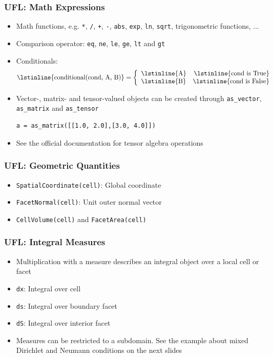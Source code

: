 \documentclass[aspectratio=169,11pt]{beamer}
\theoremstyle{definition}
\begin{document}
\begin{frame}[fragile]
  \frametitle{UFL: Math Expressions}
  \begin{itemize}
  \item Math functions, e.g. \lstinline{*}, \lstinline{/}, \lstinline{+},
    \lstinline{-}, \lstinline{abs}, \lstinline{exp}, \lstinline{ln},
    \lstinline{sqrt}, trigonometric functions, ...
  \item Comparison operator: \lstinline{eq}, \lstinline{ne}, \lstinline{le},
    \lstinline{ge}, \lstinline{lt} and \lstinline{gt}
  \item Conditionals:
    \begin{displaymath}
      \text{\lstinline{conditional(cond, A, B)}} = \left\{
        \begin{array}{lr}
          \text{\lstinline{A}} & \text{\lstinline{cond is True}} \\
          \text{\lstinline{B}} & \text{\lstinline{cond is False}}
        \end{array}
      \right.
    \end{displaymath}
  \item Vector-, matrix- and tensor-valued objects can be created through
    \lstinline{as_vector}, \lstinline{as_matrix} and \lstinline{as_tensor}
    \begin{lstlisting}
a = as_matrix([[1.0, 2.0],[3.0, 4.0]])
    \end{lstlisting}
  \item See the official documentation for tensor algebra operations
  \end{itemize}
\end{frame}

\begin{frame}[fragile]
  \frametitle{UFL: Geometric Quantities}
  \begin{itemize}
  \item \lstinline{SpatialCoordinate(cell)}: Global coordinate
  \item \lstinline{FacetNormal(cell)}: Unit outer normal vector
  \item \lstinline{CellVolume(cell)} and   \lstinline{FacetArea(cell)}
  \end{itemize}
\end{frame}

\begin{frame}[fragile]
  \frametitle{UFL: Integral Measures}
  \begin{itemize}
  \item Multiplication with a measure describes an integral object over a local
    cell or facet
  \item \lstinline{dx}: Integral over cell
  \item \lstinline{ds}: Integral over boundary facet
  \item \lstinline{dS}: Integral over interior facet
  \item Measures can be restricted to a subdomain. See the example about mixed
    Dirichlet and Neumann conditions on the next slides
  \end{itemize}
\end{frame}
\end{document}
